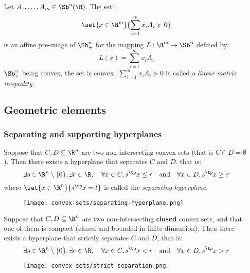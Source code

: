 \begin{example}
    Let $A_1, \dots, A_m\in\Sb^n(\R)$. The set:
    \begin{equation*}
        \set{x\in\R^m}{\sum_{i=1}^m x_iA_i\succcurlyeq 0}
    \end{equation*}
    is an affine pre-image of $\Sb_+^n$ for the mapping $L:\R^m\to\Sb^n$ defined by:
    \begin{equation*}
        L(x) = \sum_{i=1}^m x_iA_i
    \end{equation*}
    $\Sb_+^n$ being convex, the set is convex. $\sum_{i=1}^m x_iA_i\succcurlyeq 0$ is called a \emph{linear matrix inequality}.
\end{example}

\subsection{Geometric elements}
\subsubsection{Separating and supporting hyperplanes}
\begin{property}
    Soppose that $C, D\subseteq\R^n$ are two non-intersecting convex sets (that is $C\cap D = \emptyset$). Then there exists a hyperplane that separates $C$ and $D$, that is:
    \begin{equation*}
        \exists s\in\R^n\setminus\{0\}, \exists r\in\R, \quad \forall x\in C, s^\tp x\leq r \quad \text{and} \quad \forall x\in D, s^\tp x\geq r
    \end{equation*}
    where $\set{x\in\R^n}{s^\tp x = t}$ is called the \emph{separating hyperplane}.
    \begin{figure}[H]
        \centering
        \texttt{[image: convex-sets/separating-hyperplane.png]}
    \end{figure}
\end{property}

\begin{property}
    Suppose that $C, D\subseteq\R^n$ are two non-intersecting \textbf{closed} convex sets, and that one of them is compact (closed and bounded in finite dimension). Then there exists a hyperplane that strictly separates $C$ and $D$, that is:
    \begin{equation*}
        \exists s\in\R^n\setminus\{0\}, \exists r\in\R, \quad \forall x\in C, s^\tp x< r \quad \text{and} \quad \forall x\in D, s^\tp x> r
    \end{equation*}
    \begin{figure}[H]
        \centering
        \texttt{[image: convex-sets/strict-separation.png]}
    \end{figure}
\end{property}

